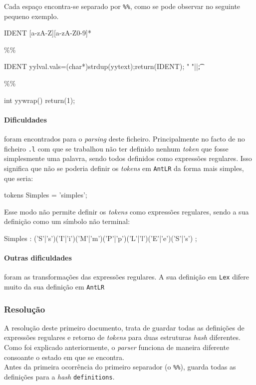 \documentclass[11pt,a4paper]{article}
\begin{document}
Cada espaço encontra-se separado por \texttt{\%\%}, como se pode observar no seguinte pequeno exemplo.\\

\begin{code_txt}
IDENT           [a-zA-Z][a-zA-Z0-9]*

\%\%

{IDENT}                 {yylval.vals=(char*)strdup(yytext);return(IDENT);}
" "|\n|\t               {;}

\%\%

int yywrap()
{ return(1); }

\end{code_txt}

\paragraph{Dificuldades} foram encontrados para o \emph{parsing} deste ficheiro. Principalmente no facto de no ficheiro \texttt{.l} com que se trabalhou não ter definido 
nenhum \emph{token} que fosse simplesmente uma palavra, sendo todos definidos como expressões regulares. Isso significa que não se poderia definir os \emph{tokens} em \texttt{AntLR}
da forma mais simples, que seria:\\

\begin{code_txt}
tokens{
	Simples = 'simples';
}
\end{code_txt}
Esse modo não permite definir os \emph{tokens} como expressões regulares, sendo a sua definição como um símbolo não terminal:\\

\begin{code_txt}
Simples	:	('S'|'s')('I'|'i')('M'|'m')('P'|'p')('L'|'l')('E'|'e')('S'|'s')
	;
\end{code_txt}

\paragraph{Outras dificuldades} foram as transformações das expressões regulares. A sua definição em \texttt{Lex} difere muito da sua definição em \texttt{AntLR}

\subsubsection{Resolução}
A resolução deste primeiro documento, trata de guardar todas as definições de expressões regulares e retorno de \emph{tokens} para duas estruturas \emph{hash} diferentes.
Como foi explicado anteriormente, o \emph{parser} funciona de maneira diferente consoante o estado em que se encontra.\\

Antes da primeira ocorrência do primeiro separador (o \texttt{\%\%}), guarda todas as definições para a \emph{hash} \texttt{definitions}. 
\end{document}
